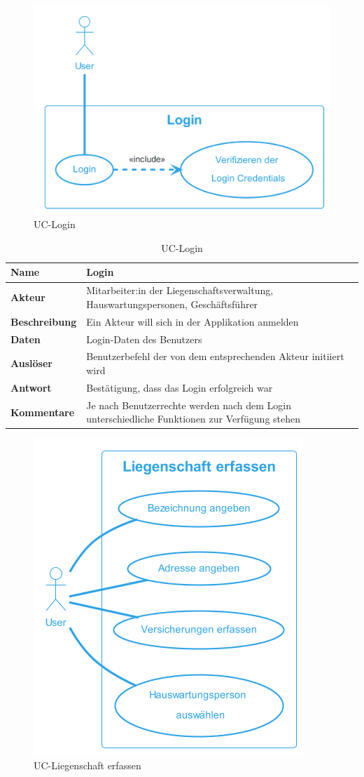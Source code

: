 
\begin{figure}[H]
  \begin{center}
    \includegraphics[width=0.6\linewidth]{content/diagrams/out/usecase/login/Login.png}
    \caption{UC-Login}
  \end{center}
\end{figure}

\begin{table}[H]
  \centering
  \settowidth{}
  \setlength\extrarowheight{2pt}
  \begin{tabulary}{1.0\textwidth}{|a|m{14cm}|}
    \hline
    \textbf{Name}& Login\\
    \hline
    \textbf{Akteur}& Mitarbeiter:in der Liegenschaftsverwaltung, Hauswartungspersonen, Geschäftsführer\\
    \hline 
    \textbf{Beschreibung} & Ein Akteur will sich in der Applikation anmelden\\
    \hline
    \textbf{Daten} & Login-Daten des Benutzers\\
    \hline
    \textbf{Auslöser} & Benutzerbefehl der von dem entsprechenden Akteur initiiert wird\\
    \hline
    \textbf{Antwort} & Bestätigung, dass das Login erfolgreich war\\
    \hline
    \textbf{Kommentare} & Je nach Benutzerrechte werden nach dem Login unterschiedliche Funktionen zur Verfügung stehen\\
    \hline
  \end{tabulary}
  \caption{UC-Login}
\end{table}

\begin{figure}[H]
  \begin{center}
    \includegraphics[width=0.43\linewidth]{content/diagrams/out/usecase/liegenschaftErfassen/LiegenschaftErfassen.png}
    \caption{UC-Liegenschaft erfassen}
  \end{center}
\end{figure}

